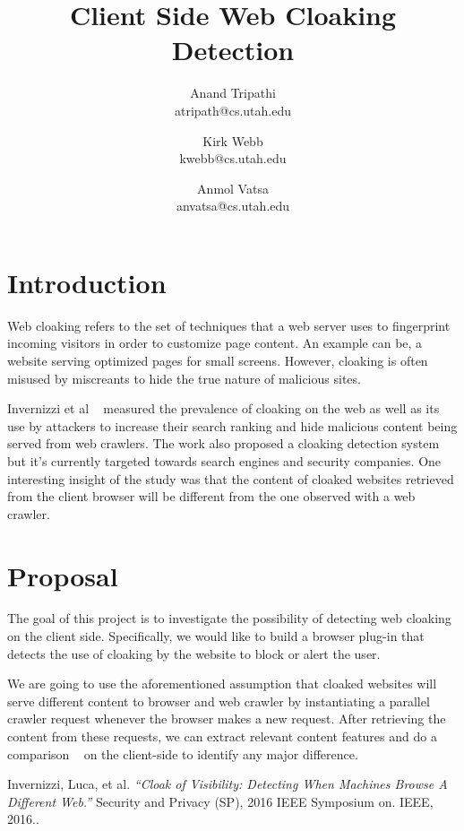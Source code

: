 \documentclass{article}
\title{Client Side Web Cloaking Detection}
\author{
Anand Tripathi\\
       atripath@cs.utah.edu
\and 
Kirk Webb\\
       kwebb@cs.utah.edu
\and
Anmol Vatsa\\
       anvatsa@cs.utah.edu
}
\begin{document}
\maketitle

\section{Introduction}
Web cloaking refers to the set of techniques that a web server uses to fingerprint incoming visitors in order to customize page content. An example can be, a website serving optimized pages for small screens. However, cloaking is often misused by miscreants to hide the true nature of malicious sites.

Invernizzi et al ~\cite{cloak} measured the prevalence of cloaking on the web as well as its use by attackers to increase their search ranking and hide malicious content being served from web crawlers. The work also proposed a cloaking detection system but it's currently targeted towards search engines and security companies. One interesting insight of the study was that the content of cloaked websites retrieved from the client browser will be different from the one observed with a web crawler.

\section{Proposal}
The goal of this project is to investigate the possibility of detecting web cloaking on the client side.  Specifically, we would like to build a browser plug-in that detects the use of cloaking by the website to block or alert the user.

We are going to use the aforementioned assumption that cloaked websites will serve different content to browser and web crawler by instantiating a parallel crawler request whenever the browser makes a new request. After retrieving the content from these requests, we can extract relevant content features and do a comparison ~\cite{cloak} on the client-side to identify any major difference.


\begin{thebibliography}{1}

   Invernizzi, Luca, et al. {\em ``Cloak of Visibility: Detecting When Machines Browse A Different Web.''} Security and Privacy (SP), 2016 IEEE Symposium on. IEEE, 2016..

\end{thebibliography}
\end{document}
